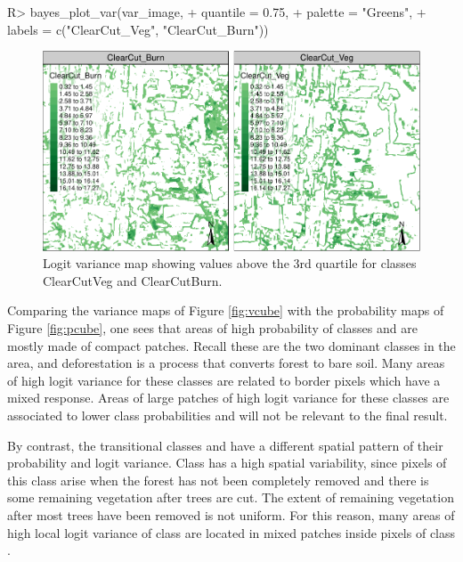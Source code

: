\documentclass[
  shortnames]{jss}
\begin{document}
\begin{CodeChunk}
\begin{CodeInput}
R> bayes_plot_var(var_image, 
+                  quantile = 0.75, 
+                  palette = "Greens",
+                  labels = c("ClearCut_Veg", "ClearCut_Burn"))
\end{CodeInput}
\begin{figure}[h]

{\centering \includegraphics{Bayesian_smoothing_JSS_files/figure-latex/vcuben-1} 

}

\caption[Logit variance map showing values above the 3rd quartile for classes ClearCutVeg and ClearCutBurn]{Logit variance map showing values above the 3rd quartile for classes ClearCutVeg and ClearCutBurn.}\label{fig:vcuben}
\end{figure}
\end{CodeChunk}

\FloatBarrier

Comparing the variance maps of Figure \ref{fig:vcube} with the probability maps of Figure \ref{fig:pcube}, one sees that areas of high probability of classes  and  are mostly made of compact patches. Recall these are the two dominant classes in the area, and deforestation is a process that converts forest to bare soil. Many areas of high logit variance for these classes are related to border pixels which have a mixed response. Areas of large patches of high logit variance for these classes are associated to lower class probabilities and will not be relevant to the final result.

By contrast, the transitional classes  and  have a different spatial pattern of their probability and logit variance. Class  has a high spatial variability, since pixels of this class arise when the forest has not been completely removed and there is some remaining vegetation after trees are cut. The extent of remaining vegetation after most trees have been removed is not uniform. For this reason, many areas of high local logit variance of class  are located in mixed patches inside pixels of class .
\end{document}
